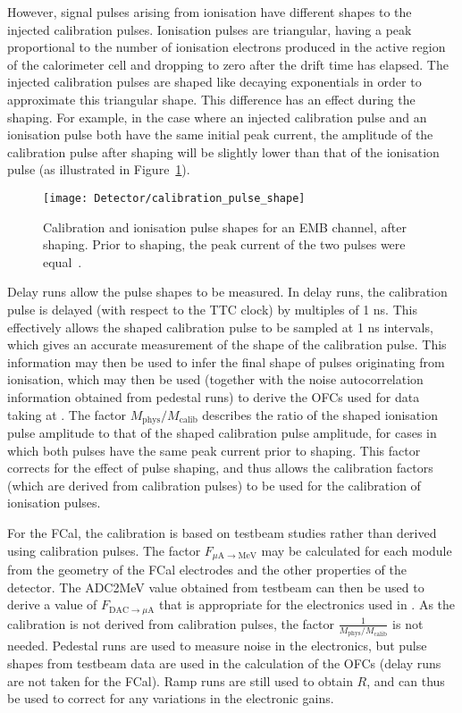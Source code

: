However, signal pulses arising from ionisation have different shapes to the injected calibration pulses. Ionisation pulses are triangular, having a peak proportional to the number of ionisation electrons produced in the active region of the calorimeter cell and dropping to zero after the drift time has elapsed. The injected calibration pulses are shaped like decaying exponentials in order to approximate this triangular shape. This difference has an effect during the shaping. For example, in the case where an injected calibration pulse and an ionisation pulse both have the same initial peak current, the amplitude of the calibration pulse after shaping will be slightly lower than that of the ionisation pulse (as illustrated in Figure~\ref{fig_calibpulsehape}). 
\begin{figure}[tb]
\begin{center}
\texttt{[image: Detector/calibration\_pulse\_shape]}
\end{center}
\caption[Calibration and ionisation pulses in the EMB.]{Calibration and ionisation pulse shapes for an EMB channel, after shaping. Prior to shaping, the peak current of the two pulses were equal~\cite{cell_equal}.}
\label{fig_calibpulsehape}
\end{figure}

Delay runs allow the pulse shapes to be measured. In delay runs, the calibration pulse is delayed (with respect to the TTC clock) by multiples of 1 ns. This effectively allows the shaped calibration pulse to be sampled at 1 ns intervals, which gives an accurate measurement of the shape of the calibration pulse. This information may then be used to infer the final shape of pulses originating from ionisation\cite{cell_equal}, which may then be used (together with the noise autocorrelation information obtained from pedestal runs) to derive the OFCs used for data taking at \atlas. The factor $M_\mathrm{phys}/M_\mathrm{calib}$ describes the ratio of the shaped ionisation pulse amplitude to that of the shaped calibration pulse amplitude, for cases in which both pulses have the same peak current prior to shaping. This factor corrects for the effect of pulse shaping, and thus allows the calibration factors (which are derived from calibration pulses) to be used for the calibration of ionisation pulses. 

For the FCal\label{FCal_ecal_page}, the calibration is based on testbeam studies rather than derived using calibration pulses. The factor $F_{\mu\mathrm{A}\rightarrow\mathrm{MeV}}$ may be calculated for each module from the geometry of the FCal electrodes and the other properties of the detector. The ADC2MeV value obtained from testbeam can then be used to derive a value of $F_{\mathrm{DAC} \rightarrow \mu\mathrm{A}}$ that is appropriate for the electronics used in \atlas. As the calibration is not derived from calibration pulses, the factor $\frac{1}{M_\mathrm{phys}/M_\mathrm{calib}}$ is not needed. Pedestal runs are used to measure noise in the electronics, but pulse shapes from testbeam data are used in the calculation of the OFCs (delay runs are not taken for the FCal). Ramp runs are still used to obtain $R$, and can thus be used to correct for any variations in the electronic gains.

